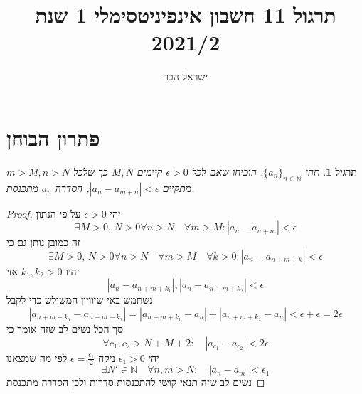 \documentclass{article}
\begin{document}
\title{תרגול 11 חשבון אינפיניטסימלי 1 שנת 2021/2}
\author{ישראל הבר}
\maketitle

\newtheorem{theorem}{משפט}
\newtheorem{lemma}{למה}
\newtheorem{exercise}{תרגיל}
\newtheorem{homeexercise}{תרגיל לבית}
\newtheorem{example}{דוגמה}
\theoremstyle{definition}
\newtheorem{definition}{הגדרה}
\newtheorem{notation}{סימון}
\newtheorem{claim}{טענה}
\newtheorem{comment}{\emph{הערה}}
\renewcommand\qedsymbol{$\blacksquare$}
\newcommand{\limtoinfty}{\underset{n\rightarrow\infty}{\lim}}
\newcommand{\limtur}{\overset{\infty}{\underset{n=1}{\sum}}}
\newcommand{\limturstart}[1]{\overset{\infty}{\underset{n=#1}{\sum}}}
\newcommand{\limsuptoinfty}{\underset{n\rightarrow\infty}{\limsup}}
\newcommand{\liminftoinfty}{\underset{n\rightarrow\infty}{\liminf}}
\newcommand{\limtoinftym}{\underset{m\rightarrow\infty}{\lim}}
\newcommand{\limtop}{\underset{-}{\lim}}
\newcommand{\limbottom}{\overset{-}{\lim}}
\newcommand{\goesto}{\underset{n\rightarrow\infty}{\longrightarrow}}
\newcommand{\goestom}{\underset{m\rightarrow\infty}{\longrightarrow}}
\newcommand{\goesfrom}{\underset{n\rightarrow\infty}{\longleftarrow}}
\newcommand{\funclim}[2]{\underset{#1\rightarrow#2}{\lim}\,}
\newcommand{\series}[2]{\{#1\}_{#2\in\mathbb{N}}}

\section{פתרון הבוחן}
\begin{exercise}
תהי 
$\series{a_n}{n}$.
הוכיחו שאם לכל 
$\epsilon>0$
קיימים 
$M,N$
כך שלכל 
$m>M, n>N$
מתקיים 
$|a_n-a_{m+n}|<\epsilon$,
הסדרה 
$a_n$
מתכנסת.
\end{exercise}

\begin{proof}
יהי 
$\epsilon>0$
על פי הנתון 
\[\exists M>0, \,N>0\forall n>N\quad \forall m>M: |a_n-a_{n+m}|<\epsilon\]
זה כמובן נותן גם כי 
\[\exists M>0, \,N>0\forall n>N\quad \forall m>M\quad\forall k>0: |a_n-a_{n+m+k}|<\epsilon\]
יהיו 
$k_1, k_2>0$
אזי 
\[|a_n-a_{n+m+k_1}|,|a_n-a_{n+m+k_2}|<\epsilon\]
נשתמש באי שיוויון המשולש כדי לקבל 
\[|a_{n+m+k_1} - a_{n+m+k_2}| = |a_{n+m+k_1} - a_n| + | a_{n+m+k_2}-a_n|<\epsilon+\epsilon = 2\epsilon\]
סך הכל נשים לב שזה אומר כי 
\[\forall c_1,c_2>N+M+2:\quad |a_{c_1} - a_{c_2}|<2\epsilon\]
יהי 
$\epsilon_1>0$
ניקח 
$\epsilon = \frac{\epsilon_1}{2}$
לפי מה שמצאנו 
\[\exists N' \in\mathbb{N} \quad\forall n,m>N:\quad |a_n-a_m|<\epsilon_1\]
נשים לב שזה תנאי קושי להתכנסות סדרות ולכן הסדרה מתכנסת
\end{proof}
\end{document}
